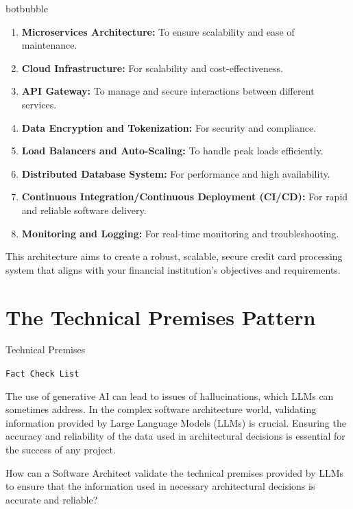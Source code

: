 \begin{chatout}{botbubble}{}
\begin{enumerate}
    \item \textbf{Microservices Architecture: }To ensure scalability and ease of maintenance.
    \item \textbf{Cloud Infrastructure:} For scalability and cost-effectiveness.
    \item \textbf{API Gateway:} To manage and secure interactions between different services.
    \item \textbf{Data Encryption and Tokenization:} For security and compliance.
    \item \textbf{Load Balancers and Auto-Scaling:} To handle peak loads efficiently.
    \item \textbf{Distributed Database System:} For performance and high availability.
    \item \textbf{Continuous Integration/Continuous Deployment (CI/CD):} For rapid and reliable software delivery.
    \item \textbf{Monitoring and Logging:} For real-time monitoring and troubleshooting.
\end{enumerate}
This architecture aims to create a robust, scalable, secure credit card processing system that aligns with your financial institution's objectives and requirements.
\end{chatout}

\begin{center}
                       
\end{center}

\section{The Technical Premises Pattern} \label{sec:technical-premises}

 Technical Premises

\texttt{Fact Check List}

 The use of generative AI can lead to issues of hallucinations, which LLMs can sometimes address. In the complex software architecture world, validating information provided by Large Language Models (LLMs) is crucial. Ensuring the accuracy and reliability of the data used in architectural decisions is essential for the success of any project.

 How can a Software Architect validate the technical premises provided by LLMs to ensure that the information used in necessary architectural decisions is accurate and reliable?

